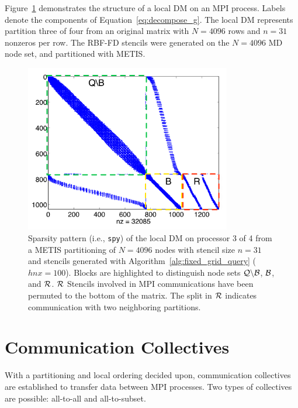 \documentclass{report}
\begin{document}
Figure~\ref{fig:decomp_spy} demonstrates the structure of a local DM on an MPI process. Labels denote the components of Equation~\ref{eq:decompose_g}. The local DM represents partition three of four from an original matrix with $N=4096$ rows and $n=31$ nonzeros per row. The RBF-FD stencils were generated on the $N=4096$ MD node set, and partitioned with METIS. 
\begin{figure}
\begin{center}
\includegraphics[width=9cm]{rbffd_methods_content/decompositions/spy_metis_stencil_example_labels.png}
\caption{Sparsity pattern (i.e., \texttt{spy}) of the local DM on processor 3 of 4 from a METIS partitioning of $N=4096$ nodes with stencil size $n=31$ and stencils generated with Algorithm~\ref{alg:fixed_grid_query} ($hnx=100$). Blocks are highlighted to distinguish node sets $\mathcal{Q} \backslash \mathcal{B}$, $\mathcal{B}$, and $\mathcal{R}$. $\mathcal{R}$ Stencils involved in MPI communications have been permuted to the bottom of the matrix. The split in $\mathcal{R}$ indicates communication with two neighboring partitions. }
\label{fig:decomp_spy}
\end{center}
\end{figure}




\section{Communication Collectives}
\label{sec:mpi_collectives}

With a partitioning and local ordering decided upon, communication collectives are established to transfer data between MPI processes. Two types of collectives are possible: all-to-all and all-to-subset. 
\end{document}
